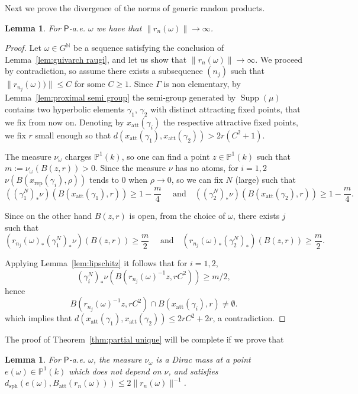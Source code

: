 \documentclass[10pt]{amsart}
\newtheorem{lemm}[theo]{Lemma}\newtheorem{prop}[theo]{Proposition}\newtheorem{coro}[theo]{Corollary}\newtheorem{conj}[theo]{Conjecture}
\theoremstyle{definition}\newtheorem{defi}[theo]{Definition}\newtheorem{rema}[theo]{Remark}\newtheorem{exam}[theo]{Example}\newtheorem{exem}[theo]{Example}\newtheorem{nota}[theo]{Notation}
\DeclareMathOperator{\supp}{Supp}
\DeclareMathOperator{\sph}{sph}
\newcommand{\nn}{\mathbb{N}}
\newcommand{\prob}{\mathsf{P}}
\newcommand{\cv}{\rightarrow}
\newcommand{\PP}{\mathbb{P}}
\newcommand{\lrpar}[1]{\left(#1\right)}
\newcommand{\att}{\mathrm{att}}
\newcommand{\rep}{\mathrm{rep}}
\begin{document}
Next we prove the divergence of the norms of generic random products.

\begin{lemm}\label{lem:contraction}
For $\prob$-a.e. $\omega$ we have that $\| r_n(\omega)\| \cv\infty$.
\end{lemm}

\begin{proof}
Let $\omega \in G^\nn$ be a sequence satisfying the conclusion of Lemma~\ref{lem:guivarch raugi}, and let us show that $\| r_n(\omega)\| \cv\infty$. We proceed by contradiction, so assume there exists a subsequence $(n_j)$ such that $\|r_{n_j}(\omega))\|\leq C$ for some $C\geq 1$. Since $\Gamma$ is non elementary, by Lemma~\ref{lem:proximal semi group} the semi-group generated by $\supp(\mu)$ contains two hyperbolic elements $\gamma_1$, $\gamma_2$ with distinct attracting fixed points, that we fix from now on. Denoting by $x_{\att}(\gamma_i)$ the respective attractive fixed points, we fix $r$ small enough so that $d(x_\att(\gamma_1),x_\att(\gamma_2)) > 2r (C^2+1)$.

The measure $\nu_\omega$ charges $\PP^1(k)$, so one can find a point $z\in \PP^1(k)$ such that $m := \nu_\omega(B(z,r))>0$. Since the measure $\nu$ has no atoms, for $i=1, 2$ $ \nu(B(x_\rep(\gamma_i),\rho))$ tends to $0$ when $\rho\to0$, so we can fix $N$ (large) such that
\[
((\gamma_1^N)_*\nu) (B(x_\att(\gamma_1),r)) \geq 1- \frac{m}{4} \quad\text{ and}\quad ((\gamma_2^{N})_*\nu)(B(x_\att(\gamma_2),r)) \geq 1- \frac{m}{4}.
\]

Since on the other hand $B(z,r)$ is open, from the choice of $\omega$, there exists $j$ such that
\[
\lrpar{ r_{n_j}(\omega)_* (\gamma_1^N)_*\nu} (B(z,r)) \geq \frac{m}{2}
\quad\text{ and}\quad \lrpar{ r_{n_j}(\omega)_*(\gamma_2^{N})_*} (B(z,r)) \geq \frac{m}{2}.
\]

Applying Lemma~\ref{lem:lipschitz} it follows that for $i=1,2$,
\[
(\gamma_i^N)_*\nu(B(r_{n_j}(\omega)^{-1}z, rC^2))\geq m/2,
\]
hence
\[
B(r_{n_j}(\omega)^{-1}z, rC^2)\cap B(x_\att(\gamma_i),r) \neq \emptyset.
\]
which implies that $d(x_\att(\gamma_1), x_\att(\gamma_2)) \le 2rC^2 + 2r$, a contradiction.
\end{proof}

The proof of Theorem~\ref{thm:partial unique} will be complete if we prove that

\begin{lemm}\label{lem:Dirac}
For $\prob$-a.e. $\omega$, the measure $\nu_\omega$ is a Dirac mass at a point $e(\omega)\in \PP^1(k)$ which does not depend on $\nu$, and satisfies $d_{\sph}(e(\omega), B_\att(r_n(\omega))) \le 2\|r_n(\omega)\|^{-1}$.
\end{lemm}
\end{document}
